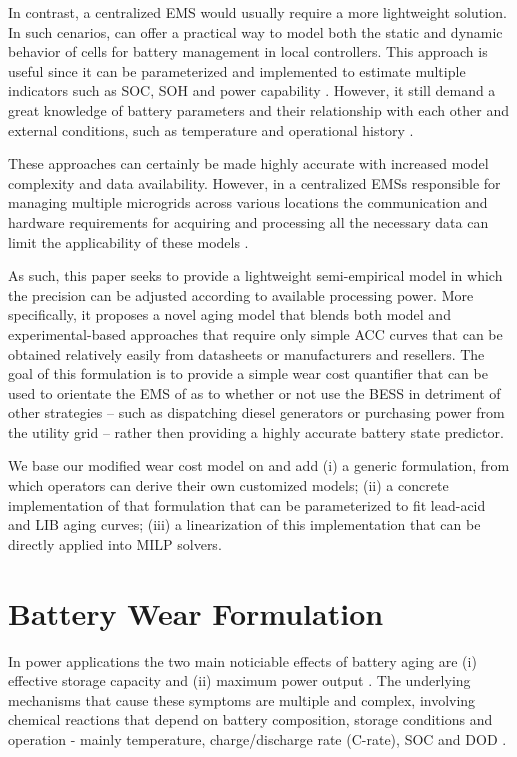 \documentclass{ieeeaccess}
\begin{document}
    In contrast, a centralized \ac{EMS} would usually require a more lightweight solution. In such cenarios,  can offer a practical way to model both the static and dynamic behavior of cells for battery management in local controllers. This approach is useful since it can be parameterized and implemented to estimate multiple indicators such as \ac{SOC}, \ac{SOH} and power capability \cite{verbrugge2004adaptive, verbrugge2007adaptive}. However, it still demand a great knowledge of battery parameters and their relationship with each other and external conditions, such as temperature and operational history \cite{zhang2018online}.

    These approaches can certainly be made highly accurate with increased model complexity and data availability. However, in a centralized \acp{EMS} responsible for managing multiple microgrids across various locations the communication and hardware requirements for acquiring and processing all the necessary data can limit the applicability of these models \cite{DIMEASHATZIARGYRIOU2005}.

    As such, this paper seeks to provide a lightweight semi-empirical model in which the precision can be adjusted according to available processing power. More specifically, it proposes a novel aging model that blends both model and experimental-based approaches that require only simple \ac{ACC} curves that can be obtained relatively easily from datasheets or manufacturers and resellers. The goal of this formulation is to provide a simple wear cost quantifier that can be used to orientate the \ac{EMS} of  as to whether or not use the \ac{BESS} in detriment of other strategies -- such as dispatching diesel generators or purchasing power from the utility grid -- rather then providing a highly accurate battery state predictor.

    We base our modified wear cost model on \cite{HAN2014} and add (i) a generic formulation, from which operators can derive their own customized models; (ii) a concrete implementation of that formulation that can be parameterized to fit lead-acid and \ac{LIB} aging curves; (iii) a linearization of this implementation that can be directly applied into \ac{MILP} solvers.

\section{Battery Wear Formulation}

    In power applications the two main noticiable effects of battery aging are (i) effective storage capacity and (ii) maximum power output \cite{han2014comparative, chemali2015minimizing, al2010mathematical}. The underlying mechanisms that cause these symptoms are multiple and complex, involving chemical reactions that depend on battery composition, storage conditions and operation - mainly temperature, charge/discharge rate (C-rate), \ac{SOC} and \ac{DOD} \cite{xiong2020lithium, vetter2005ageing, calearo2019modeling}.
\end{document}

